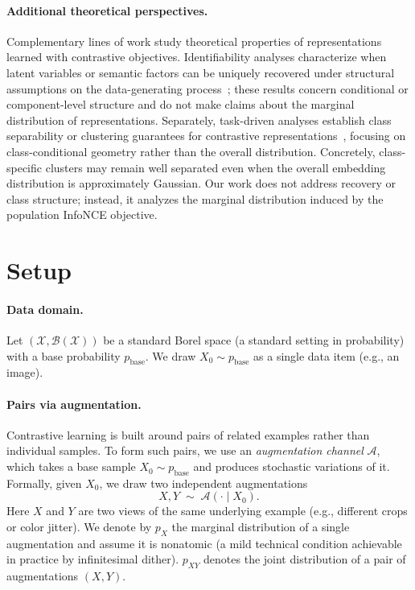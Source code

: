 \documentclass{article}
\begin{document}
\paragraph{Additional theoretical perspectives.}
Complementary lines of work study theoretical properties of representations learned with contrastive objectives.
Identifiability analyses characterize when latent variables or semantic factors can be uniquely recovered under structural assumptions on the data-generating process~\citep{hyvarinen2016unsupervised,hyvarinen2019nonlinear,zimmermann2021contrastive,roeder2021linear, reizinger2024cross}; these results concern conditional or component-level structure and do not make claims about the marginal distribution of representations.
Separately, task-driven analyses establish class separability or clustering guarantees for contrastive representations~\citep{saunshi2019theoretical,haochen2021provable}, focusing on class-conditional geometry rather than the overall distribution. Concretely, class-specific clusters may remain well separated even when the overall embedding distribution is approximately Gaussian.
Our work does not address recovery or class structure; instead, it analyzes the marginal distribution induced by the population InfoNCE objective.

\section{Setup}
\label{sec:setup}

\paragraph{Data domain.}
Let $(\mathcal X,\mathcal{B}(\mathcal{X}))$ be a standard Borel space (a standard setting in probability) with a base probability $p_{\mathrm{base}}$.  
We draw $X_0\sim p_{\mathrm{base}}$ as a single data item (e.g., an image).  
%

\paragraph{Pairs via augmentation.}  
Contrastive learning is built around pairs of related examples rather than individual samples. 
To form such pairs, we use an \emph{augmentation channel} $\mathcal A$, which takes a base sample $X_0 \sim p_{\mathrm{base}}$ 
and produces stochastic variations of it. Formally, given $X_0$, we draw two independent augmentations
\begin{equation}
\label{eq:augmentations}
X, Y \;\sim\; \mathcal A(\cdot \mid X_0).
\end{equation}
Here $X$ and $Y$ are two views of the same underlying example (e.g., different crops or color jitter).
We denote by $p_X$ the marginal distribution of a single augmentation and assume it is nonatomic (a mild technical condition achievable in practice by infinitesimal dither). $p_{XY}$ denotes the joint distribution of a pair of augmentations $(X,Y)$.
\end{document}

